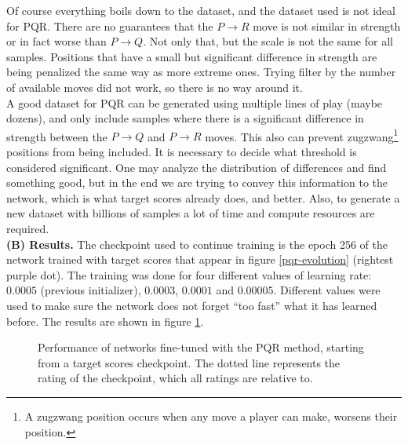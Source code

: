 Of course everything boils down to the dataset, and the dataset used is not ideal for PQR. There are no guarantees that the $P \rightarrow R$ move is not similar in strength or in fact worse than $P \rightarrow Q$. Not only that, but the scale is not the same for all samples. Positions that have a small but significant difference in strength are being penalized the same way as more extreme ones. Trying filter by the number of available moves did not work, so there is no way around it. \\

A good dataset for PQR can be generated using multiple lines of play (maybe dozens), and only include samples where there is a significant difference in strength between the $P \rightarrow Q$ and $P \rightarrow R$ moves. This also can prevent zugzwang\footnote{A zugzwang position occurs when any move a player can make, worsens their position.} positions from being included. It is necessary to decide what threshold is considered significant. One may analyze the distribution of differences and find something good, but in the end we are trying to convey this information to the network, which is what target scores already does, and better. Also, to generate a new dataset with billions of samples a lot of time and compute resources are required. \\

\textbf{(B) Results.} The checkpoint used to continue training is the epoch 256 of the network trained with target scores that appear in figure \ref{pqr-evolution} (rightest purple dot). The training was done for four different values of learning rate: $0.0005$ (previous initializer), $0.0003$, $0.0001$ and $0.00005$. Different values were used to make sure the network does not forget \enquote{too fast} what it has learned before. The results are shown in figure \ref{pqr-ckp}.

\begin{figure}[H]
\centering
{}
\caption{Performance of networks fine-tuned with the PQR method, starting from a target scores checkpoint. The dotted line represents the rating of the checkpoint, which all ratings are relative to.}
\label{pqr-ckp}
\end{figure}

